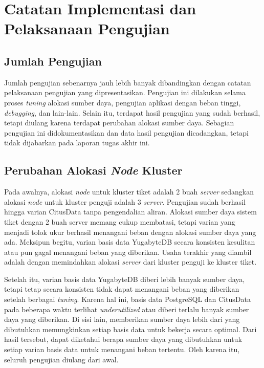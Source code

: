 \chapter{Catatan Implementasi dan Pelaksanaan Pengujian}
\label{apx:text-run-notes}

\section{Jumlah Pengujian}

Jumlah pengujian sebenarnya jauh lebih banyak dibandingkan dengan catatan pelaksanaan pengujian yang dipresentasikan. Pengujian ini dilakukan selama proses \textit{tuning} alokasi sumber daya, pengujian aplikasi dengan beban tinggi, \textit{debugging}, dan lain-lain. Selain itu, terdapat hasil pengujian yang sudah berhasil, tetapi diulang karena terdapat perubahan alokasi sumber daya. Sebagian pengujian ini didokumentasikan dan data hasil pengujian dicadangkan, tetapi tidak dijabarkan pada laporan tugas akhir ini.

\section{Perubahan Alokasi \textit{Node} Kluster}

Pada awalnya, alokasi \textit{node} untuk kluster tiket adalah 2 buah \textit{server} sedangkan alokasi \textit{node} untuk kluster penguji adalah 3 \textit{server}. Pengujian sudah berhasil hingga varian CitusData tanpa pengendalian aliran. Alokasi sumber daya sistem tiket dengan 2 buah server memang cukup membatasi, tetapi varian yang menjadi tolok ukur berhasil menangani beban dengan alokasi sumber daya yang ada. Meksipun begitu, varian basis data YugabyteDB secara konsisten kesulitan atau pun gagal menangani beban yang diberikan. Usaha terakhir yang diambil adalah dengan memindahkan alokasi \textit{server} dari kluster penguji ke kluster tiket. 

Setelah itu, varian basis data YugabyteDB diberi lebih banyak sumber daya, tetapi tetap secara konsisten tidak dapat menangani beban yang diberikan setelah berbagai \textit{tuning}. Karena hal ini, basis data PostgreSQL dan CitusData pada beberapa waktu terlihat \textit{underutilized} atau diberi terlalu banyak sumber daya yang diberikan. Di sisi lain, memberikan sumber daya lebih dari yang dibutuhkan memungkinkan setiap basis data untuk bekerja secara optimal. Dari hasil tersebut, dapat diketahui berapa sumber daya yang dibutuhkan untuk setiap varian basis data untuk menangani beban tertentu. Oleh karena itu, seluruh pengujian diulang dari awal.


